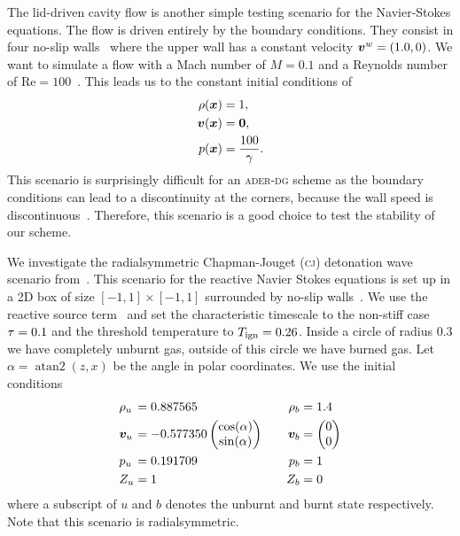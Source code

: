 The lid-driven cavity flow is another simple testing scenario for the Navier-Stokes equations.
The flow is driven entirely by the boundary conditions.
They consist in four no-slip walls~ where the upper wall has a constant velocity $\bm{v}^w = (1.0, 0)$.
We want to simulate a flow with a Mach number of $M = 0.1$ and a Reynolds number of $\text{Re} = 100$~\cite{fambri2017space}.
This leads us to the constant initial conditions of
\begin{align}
  \label{eq:lid-driven-cavity}
  \begin{split}
  \rho(\bm{x}) &= 1,\\
  \bm{v}(\bm{x}) &=  \bm{0},\\
  p(\bm{x}) &= \frac{100}{\gamma}.
  \end{split}
\end{align}
This scenario is surprisingly difficult for an \textsc{ader-dg} scheme as the boundary conditions can lead to a discontinuity at the corners, because the wall speed is discontinuous~\cite{fambri2017space}.
Therefore, this scenario is a good choice to test the stability of our scheme.

We investigate the radialsymmetric Chapman-Jouget (\textsc{cj}) detonation wave scenario from~\cite{helzel2000modified}.
This scenario for the reactive Navier Stokes equations is set up in a 2D box of size $[-1, 1] \times [-1, 1]$ surrounded by no-slip walls~.
We use the reactive source term~ and set the characteristic timescale to the non-stiff case $\tau = 0.1$ and the threshold temperature to $T_{\text{ign}} = 0.26$.
Inside a circle of radius $0.3$ we have completely unburnt gas, outside of this circle we have burned gas.
Let $\alpha =  \operatorname{atan2}(z,x)$ be the angle in polar coordinates.
We use the initial conditions
\begin{equation}\label{eq:cj-detonation}
\begin{alignedat}{6}
  & \rho_u &&= 0.887565 \qquad& \rho_b &= 1.4\\
  & \bm{v}_u &&= -0.577350
  \begin{pmatrix}
     \cos (\alpha)\\
     \sin (\alpha)
   \end{pmatrix}  \qquad& \bm{v}_b  &=
   \begin{pmatrix}
     0 \\
     0
   \end{pmatrix}\\
   & p_u &&=0.191709 \qquad& p_b &= 1\\
   & Z_u &&= 1 \quad& Z_b &= 0
  \end{alignedat}
\end{equation}
where a subscript of $u$ and $b$ denotes the unburnt and burnt state respectively.
Note that this scenario is radialsymmetric.

